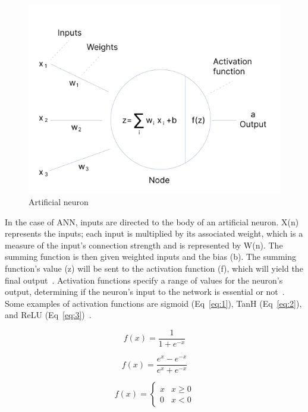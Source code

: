     \begin{figure}[htbp]
        \centering
        \includegraphics[width=0.65\linewidth]{Chapters/Figures/an.png}
        \caption{Artificial neuron~\cite{Baheti12Choose}}
        \label{fig:an}
    \end{figure}
    
    In the case of \gls{ANN}, inputs are directed to the body of an artificial neuron. X(n) represents the inputs; each input is multiplied by its associated weight, which is a measure of the input's connection strength and is represented by W(n). The summing function is then given weighted inputs and the bias (b). The summing function's value (z) will be sent to the activation function (f), which will yield the final output~\cite{Imran2019AClassification}. Activation functions specify a range of values for the neuron's output, determining if the neuron's input to the network is essential or not~\cite{2020ArtificialNetworks}. Some examples of activation functions are sigmoid (Eq~\ref{eq:1}), TanH (Eq~\ref{eq:2}), and ReLU (Eq~\ref{eq:3})~\cite{EnyinnaNwankpa2018ActivationLearning}.
    
    
    \begin{equation}\label{eq:1}
        f(x) = \frac{1}{1+e^{-x}}
    \end{equation}
    
    \begin{equation}\label{eq:2}
        f(x) = \frac{e^{x}-e^{-x}}{e^{x}+e^{-x}}
    \end{equation}
    
    \begin{equation} \label{eq:3}
        f(x) = \begin{cases}x & x \geq 0\\0 & x < 0\end{cases}
    \end{equation}
    
